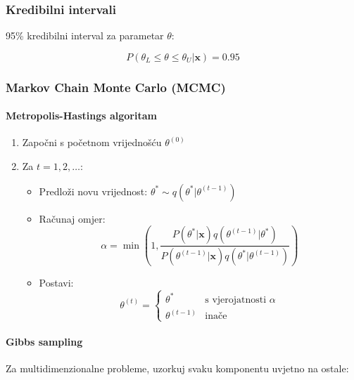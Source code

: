 \documentclass[11pt,oneside]{book}
\begin{document}
\subsubsection{Kredibilni intervali}

95\% kredibilni interval za parametar $\theta$:

\begin{equation}
	P(\theta_L \leq \theta \leq \theta_U | \mathbf{x}) = 0.95
\end{equation}

\subsubsection{Markov Chain Monte Carlo (MCMC)}

\paragraph{Metropolis-Hastings algoritam}

\begin{enumerate}
	\item Započni s početnom vrijednošću $\theta^{(0)}$
	\item Za $t = 1, 2, \ldots$:
	\begin{itemize}
		\item Predloži novu vrijednost: $\theta^* \sim q(\theta^* | \theta^{(t-1)})$
		\item Računaj omjer: 
		\begin{equation}
			\alpha = \min\left(1, \frac{P(\theta^* | \mathbf{x}) q(\theta^{(t-1)} | \theta^*)}{P(\theta^{(t-1)} | \mathbf{x}) q(\theta^* | \theta^{(t-1)})}\right)
		\end{equation}
		\item Postavi: 
		\begin{equation}
			\theta^{(t)} = \begin{cases} 
				\theta^* & \text{s vjerojatnosti } \alpha \\ 
				\theta^{(t-1)} & \text{inače} 
			\end{cases}
		\end{equation}
	\end{itemize}
\end{enumerate}

\paragraph{Gibbs sampling}

Za multidimenzionalne probleme, uzorkuj svaku komponentu uvjetno na ostale:
\end{document}

